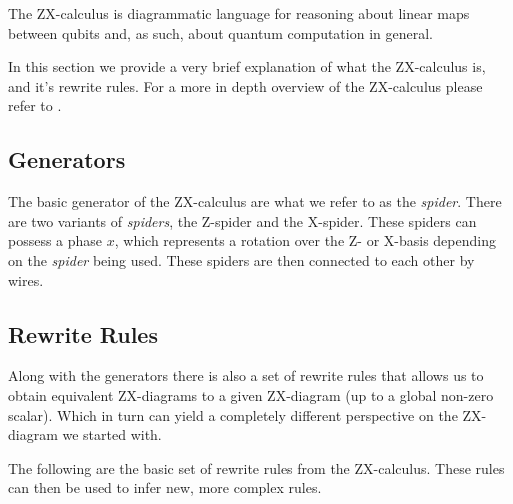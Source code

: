 The ZX-calculus is diagrammatic language for reasoning about linear maps between qubits and, as such, about quantum computation in general.

In this section we provide a very brief explanation of what the ZX-calculus is, and it's rewrite rules. For a more in depth overview of the ZX-calculus please refer to \cite{ZX-overview}.

\subsection{Generators}
The basic generator of the ZX-calculus are what we refer to as the \textit{spider}. There are two variants of \textit{spiders}, the Z-spider and the X-spider. These spiders can possess a phase $x$, which represents a rotation over the Z- or X-basis depending on the \textit{spider} being used. These spiders are then connected to each other by wires.

\subsection{Rewrite Rules}
Along with the generators there is also a set of rewrite rules that allows us to obtain equivalent ZX-diagrams to a given ZX-diagram (up to a global non-zero scalar). Which in turn can yield a completely different perspective on the ZX-diagram we started with.

The following are the basic set of rewrite rules from the ZX-calculus. These rules can then be used to infer new, more complex rules.

